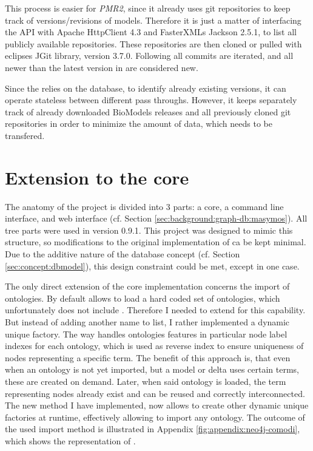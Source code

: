 	This process is easier for \emph{PMR2}, since it already uses git repositories to keep track of versions/revisions of models. Therefore it is just a matter of interfacing the \rest API with Apache HttpClient 4.3 and FasterXMLs Jackson 2.5.1, to list all publicly available repositories. These repositories are then cloned or pulled with eclipses JGit library, version 3.7.0. Following all commits are iterated, and all newer than the latest version in \masymos are considered new.

	Since the \modelcrawler relies on the \masymos database, to identify already existing versions, it can operate stateless between different pass throughs. However, it keeps separately track of already downloaded BioModels releases and all previously cloned git repositories in order to minimize the amount of data, which needs to be transfered.

\section{Extension to the \masymos core}
	\label{sec:impl:masymos}
	The anatomy of the \masymos project is divided into 3 parts: a core, a command line interface, and web \rest interface (cf. Section \ref{sec:background:graph-db:masymos}). All tree parts were used in version 0.9.1. This project was designed to mimic this structure, so modifications to the original implementation of \masymos ca be kept minimal. Due to the additive nature of the database concept (cf. Section \ref{sec:concept:dbmodel}), this design constraint could be met, except in one case.
	
	The only direct extension of the core implementation concerns the import of ontologies. By default \masymos allows to load a hard coded set of ontologies, which unfortunately does not include \comodi. Therefore I needed to extend \masymos for this capability. But instead of adding another name to list, I rather implemented a dynamic unique factory. The way \masymos handles ontologies features in particular node label indexes for each ontology, which is used as reverse index to ensure uniqueness of nodes representing a specific term.
	The benefit of this approach is, that even when an ontology is not yet imported, but a model or delta uses certain terms, these are created on demand. Later, when said ontology is loaded, the term representing nodes already exist and can be reused and correctly interconnected.
	The new method I have implemented, now allows to create other dynamic unique factories at runtime, effectively allowing to import any ontology.
	The outcome of the used import method is illustrated in Appendix \ref{fig:appendix:neo4j-comodi}, which shows the \neoj representation of \comodi.

